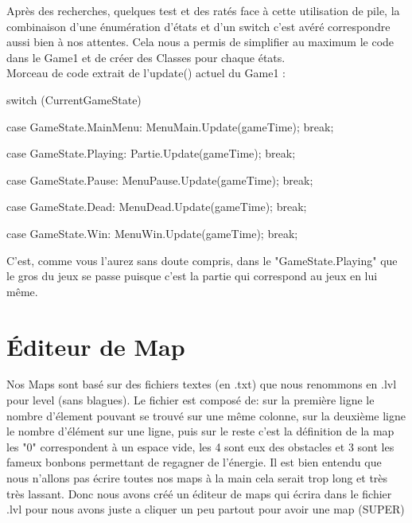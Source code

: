 \documentclass [11pt]{report}
\begin{document}
	Après des recherches, quelques test et des ratés face à cette utilisation de pile, la combinaison d'une énumération d'états et d'un switch c'est avéré correspondre aussi bien à nos attentes. Cela nous a permis de simplifier au maximum le code dans le Game1 et de créer des Classes pour chaque états.\\
			
	\noindent Morceau de code extrait de l'update() actuel du Game1 :
	
	
	\begin{mylisting}
			
	switch (CurrentGameState)
	{
		case GameState.MainMenu:
			MenuMain.Update(gameTime);
			break;
			
		case GameState.Playing:
			Partie.Update(gameTime);
			break;
			
		case GameState.Pause:
			MenuPause.Update(gameTime);
			break;
			
		case GameState.Dead:
			MenuDead.Update(gameTime);		
			break;
			
		case GameState.Win:
			MenuWin.Update(gameTime);
			break;
	}
			\end{mylisting}
	
	\vspace{10mm}
	
	C'est, comme vous l'aurez sans doute compris, dans le "GameState.Playing" que le gros du jeux se passe puisque c'est la partie qui correspond au jeux en lui même.
	
	
	\vspace{10mm}
	
	
	\section{\'Editeur de Map}
	Nos Maps sont basé sur des fichiers textes (en .txt) que nous renommons en .lvl pour level (sans blagues). Le fichier est composé de: sur la première ligne le nombre d'élement pouvant se trouvé sur une même colonne, sur la deuxième ligne le nombre d'élément sur une ligne, puis sur le reste c'est la définition de la map %
	\\
	les "0" correspondent à un espace vide, les 4 sont eux des obstacles et 3 sont les fameux bonbons permettant de regagner de l'énergie.
	\indent Il est bien entendu que nous n'allons pas écrire toutes nos maps à la main cela serait trop long et très très lassant. Donc nous avons créé un éditeur de maps qui écrira dans le fichier .lvl pour nous avons juste a cliquer un peu partout pour avoir une map (SUPER) %
	 
\end{document}
